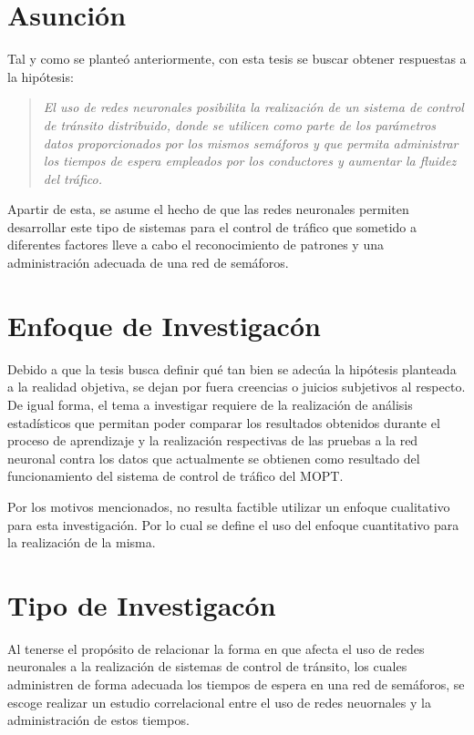 \section{Asunci\'{o}n}

Tal y como se plante\'{o} anteriormente, con esta tesis se buscar obtener
respuestas a la hip\'{o}tesis:

\begin{quote}
	\textit{El uso de redes neuronales posibilita la realizaci\'{o}n de un sistema
de control de tr\'{a}nsito distribuido, donde se utilicen como parte de los par\'{a}metros datos
proporcionados por los mismos sem\'{a}foros y que permita administrar los tiempos de
espera empleados por los conductores y aumentar la fluidez del tr\'{a}fico.}
\end{quote}

	Apartir de esta, se asume el hecho de que las redes neuronales permiten
desarrollar este tipo de sistemas para el control de tr\'{a}fico que sometido a
diferentes factores lleve a cabo el reconocimiento de patrones y una
administraci\'{o}n adecuada de una red de sem\'{a}foros.

\section{Enfoque de Investigac\'{o}n}

	
	Debido a que la tesis busca definir qu\'{e} tan bien se adec\'{u}a la
	hip\'{o}tesis planteada a la realidad objetiva, se dejan por fuera creencias o juicios
subjetivos al respecto. De igual forma, el tema a investigar requiere de la
realizaci\'{o}n de an\'{a}lisis estad\'{i}sticos que permitan poder comparar
los resultados obtenidos durante el proceso de aprendizaje y la realizaci\'{o}n
respectivas de las pruebas a la red neuronal contra los datos que actualmente
se obtienen como resultado del funcionamiento del sistema de control de
tr\'{a}fico del MOPT.
	
	Por los motivos mencionados, no resulta factible utilizar un enfoque
cualitativo para esta investigaci\'{o}n. Por lo cual se define el uso del
enfoque cuantitativo para la realizaci\'{o}n de la misma.

\section{Tipo de Investigac\'{o}n}


	Al tenerse el prop\'{o}sito de relacionar la forma en que afecta el uso de
redes neuronales a la realizaci\'{o}n de sistemas de control de tr\'{a}nsito,
los cuales administren de forma adecuada los tiempos de espera en una red
de sem\'{a}foros, se escoge realizar un estudio correlacional entre el uso de
redes neuornales y la administraci\'{o}n de estos tiempos.

